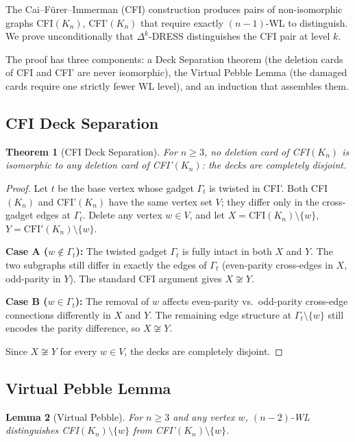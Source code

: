 \documentclass[11pt,a4paper]{article}
\newtheorem{theorem}{Theorem}
\newtheorem{lemma}[theorem]{Lemma}
\begin{document}
The Cai--F\"urer--Immerman (CFI) construction \cite{cai1992optimal} produces pairs of non-isomorphic graphs CFI$(K_n)$, CFI'$(K_n)$ that require exactly $(n{-}1)$-WL to distinguish. We prove unconditionally that $\Delta^k$-DRESS distinguishes the CFI pair at level $k$.

The proof has three components: a Deck Separation theorem (the deletion cards of CFI and CFI' are never isomorphic), the Virtual Pebble Lemma (the damaged cards require one strictly fewer WL level), and an induction that assembles them.

\subsection{CFI Deck Separation}

\begin{theorem}[CFI Deck Separation]
\label{thm:cfi-deck}
For $n \geq 3$, no deletion card of CFI$(K_n)$ is isomorphic to any deletion card of CFI'$(K_n)$: the decks are completely disjoint.
\end{theorem}

\begin{proof}
Let $t$ be the base vertex whose gadget $\Gamma_t$ is twisted in CFI'. Both CFI$(K_n)$ and CFI'$(K_n)$ have the same vertex set $V$; they differ only in the cross-gadget edges at $\Gamma_t$. Delete any vertex $w \in V$, and let $X = \text{CFI}(K_n) \setminus \{w\}$, $Y = \text{CFI}'(K_n) \setminus \{w\}$.

\textbf{Case A ($w \notin \Gamma_t$):} The twisted gadget $\Gamma_t$ is fully intact in both $X$ and $Y$. The two subgraphs still differ in exactly the edges of $\Gamma_t$ (even-parity cross-edges in $X$, odd-parity in $Y$). The standard CFI argument gives $X \not\cong Y$.

\textbf{Case B ($w \in \Gamma_t$):} The removal of $w$ affects even-parity vs.\ odd-parity cross-edge connections differently in $X$ and $Y$. The remaining edge structure at $\Gamma_t \setminus \{w\}$ still encodes the parity difference, so $X \not\cong Y$.

Since $X \not\cong Y$ for every $w \in V$, the decks are completely disjoint.
\end{proof}

\subsection{Virtual Pebble Lemma}

\begin{lemma}[Virtual Pebble]
\label{lem:virtual-pebble}
For $n \geq 3$ and any vertex $w$, $(n-2)$-WL distinguishes CFI$(K_n) \setminus \{w\}$ from CFI'$(K_n) \setminus \{w\}$.
\end{lemma}
\end{document}
